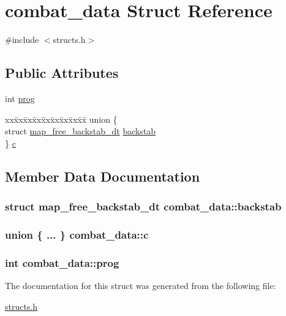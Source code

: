 \hypertarget{structcombat__data}{\section{combat\-\_\-data Struct Reference}
\label{structcombat__data}
}


{\ttfamily \#include $<$structs.\-h$>$}

\subsection*{Public Attributes}
\begin{DoxyCompactItemize}
\item 
int \hyperlink{structcombat__data_a57c68482a06a9111fb3e84bedc53075d}{prog}
\item 
\begin{tabbing}
xx\=xx\=xx\=xx\=xx\=xx\=xx\=xx\=xx\=\kill
union \{\\
\>struct \hyperlink{structmap__free__backstab__dt}{map\_free\_backstab\_dt} \hyperlink{structcombat__data_ab077e425de9cfbcf58900665cc8324d7}{backstab}\\
\} \hyperlink{structcombat__data_ab7d69c1a8582aea1e5fd834e401c200b}{c}\\

\end{tabbing}\end{DoxyCompactItemize}


\subsection{Member Data Documentation}
\hypertarget{structcombat__data_ab077e425de9cfbcf58900665cc8324d7}{
\subsubsection[{backstab}]{\setlength{\rightskip}{0pt plus 5cm}struct {\bf map\-\_\-free\-\_\-backstab\-\_\-dt} combat\-\_\-data\-::backstab}}\label{structcombat__data_ab077e425de9cfbcf58900665cc8324d7}
\hypertarget{structcombat__data_ab7d69c1a8582aea1e5fd834e401c200b}{
\subsubsection[{c}]{\setlength{\rightskip}{0pt plus 5cm}union \{ ... \}   combat\-\_\-data\-::c}}\label{structcombat__data_ab7d69c1a8582aea1e5fd834e401c200b}
\hypertarget{structcombat__data_a57c68482a06a9111fb3e84bedc53075d}{
\subsubsection[{prog}]{\setlength{\rightskip}{0pt plus 5cm}int combat\-\_\-data\-::prog}}\label{structcombat__data_a57c68482a06a9111fb3e84bedc53075d}


The documentation for this struct was generated from the following file\-:\begin{DoxyCompactItemize}
\item 
\hyperlink{structs_8h}{structs.\-h}\end{DoxyCompactItemize}
